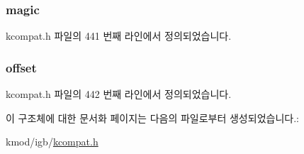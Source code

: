 \subsubsection[{\texorpdfstring{magic}{magic}}]{ magic}\hypertarget{structethtool__eeprom_a1c2f2992893a71ac0ee3f43477000176}{}\label{structethtool__eeprom_a1c2f2992893a71ac0ee3f43477000176}


kcompat.\+h 파일의 441 번째 라인에서 정의되었습니다.

\subsubsection[{\texorpdfstring{offset}{offset}}]{ offset}\hypertarget{structethtool__eeprom_a4ba37e6b40e12ce1d1e5dbee0323069d}{}\label{structethtool__eeprom_a4ba37e6b40e12ce1d1e5dbee0323069d}


kcompat.\+h 파일의 442 번째 라인에서 정의되었습니다.



이 구조체에 대한 문서화 페이지는 다음의 파일로부터 생성되었습니다.\+:\begin{DoxyCompactItemize}
\item 
kmod/igb/\hyperlink{kcompat_8h}{kcompat.\+h}\end{DoxyCompactItemize}
